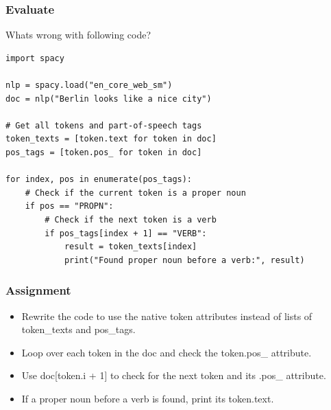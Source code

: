 \begin{frame}[fragile]\frametitle{Evaluate}

Whats wrong with following code?

  \begin{lstlisting}
import spacy

nlp = spacy.load("en_core_web_sm")
doc = nlp("Berlin looks like a nice city")

# Get all tokens and part-of-speech tags
token_texts = [token.text for token in doc]
pos_tags = [token.pos_ for token in doc]

for index, pos in enumerate(pos_tags):
    # Check if the current token is a proper noun
    if pos == "PROPN":
        # Check if the next token is a verb
        if pos_tags[index + 1] == "VERB":
            result = token_texts[index]
            print("Found proper noun before a verb:", result)
  \end{lstlisting}

\end{frame}

\begin{frame}[fragile]\frametitle{Assignment}


  \begin{itemize}
    \item Rewrite the code to use the native token attributes instead of lists of token\_texts and pos\_tags.
    \item Loop over each token in the doc and check the token.pos\_ attribute.
    \item Use doc[token.i + 1] to check for the next token and its .pos\_ attribute.
    \item If a proper noun before a verb is found, print its token.text.
  \end{itemize}

\end{frame}



